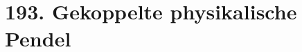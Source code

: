 \documentclass{alex_hü}
\begin{document}
\renewcommand{\labelenumi}{\alph{enumi})}


\section*{193. Gekoppelte physikalische Pendel}
\end{document}
